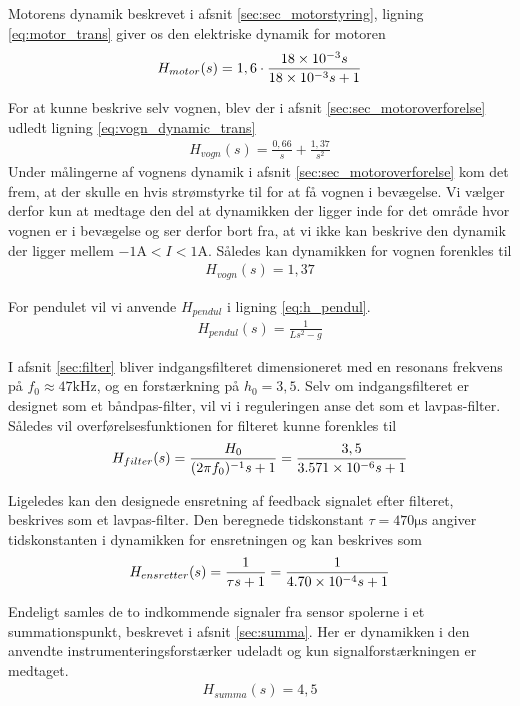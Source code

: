 Motorens dynamik beskrevet i afsnit \ref{sec:sec_motorstyring}, ligning \ref{eq:motor_trans} giver os den elektriske dynamik for motoren
\begin{align}
H_{motor}(s) = 1,6 \cdot \frac{\num{18E-3}s}{\num{18E-3}s +1}
\end{align}

For at kunne beskrive selv vognen, blev der i afsnit \ref{sec:sec_motoroverforelse} udledt ligning \ref{eq:vogn_dynamic_trans}
\begin{align}
H_{vogn}(s) =\frac{0,66}{s} + \frac{1,37}{s^2} 
\end{align}
Under målingerne af vognens dynamik i afsnit \ref{sec:sec_motoroverforelse} kom det frem, at der skulle en hvis strømstyrke til for at få vognen i bevægelse.
Vi vælger derfor kun at medtage den del at dynamikken der ligger inde for det område hvor vognen er i bevægelse og ser derfor bort fra, at vi ikke kan beskrive den dynamik der ligger mellem $-1 \si{\ampere} < I < 1 \si{\ampere}$. 
Således kan dynamikken for vognen forenkles til
\begin{align}
 H_{vogn}(s) = 1,37
\end{align}

For pendulet vil vi anvende $H_{pendul}$ i ligning \ref{eq:h_pendul}.
\begin{align}
H_{pendul}(s) = \frac{1}{Ls^2 - g} 
\end{align}

I afsnit \ref{sec:filter} bliver indgangsfilteret dimensioneret med en resonans frekvens på $f_0 \approx 47 \si{\kilo\hertz}$, og en forstærkning på $h_0 = 3,5$. 
Selv om indgangsfilteret er designet som et båndpas-filter, vil vi i reguleringen anse det som et lavpas-filter.
Således vil overførelsesfunktionen for filteret kunne forenkles til 
\begin{align}
H_{filter}(s) = \frac{H_0}{(2 \pi f_0)^{-1}s +1} = \frac{3,5}{\num{3.571E-06}s +1}
\end{align}

Ligeledes kan den designede ensretning af feedback signalet efter filteret, beskrives som et lavpas-filter.
Den beregnede tidskonstant $\tau = 470 \si{\micro\second}$ angiver tidskonstanten i dynamikken for ensretningen og kan beskrives som
\begin{align}
H_{ensretter}(s) = \frac{1}{\tau s +1} = \frac{1}{\num{4.70E-4}s +1}
\end{align} 

Endeligt samles de to indkommende signaler fra sensor spolerne i et summationspunkt, beskrevet i afsnit \ref{sec:summa}.
Her er dynamikken i den anvendte instrumenteringsforstærker udeladt og kun signalforstærkningen er medtaget.
\begin{align}
H_{summa}(s) = 4,5
\end{align}  

